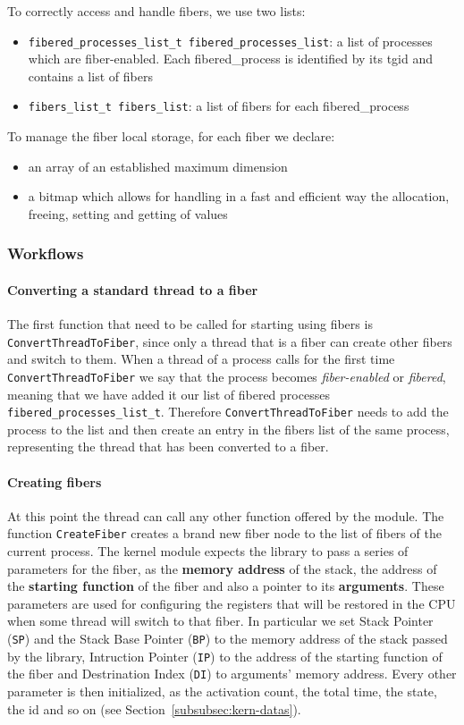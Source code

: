 \documentclass[a4paper,10pt]{article}
\begin{document}
To correctly access and handle fibers, we use two lists:
\begin{itemize}
	\item \lstinline{fibered_processes_list_t fibered_processes_list}: a list of processes which are fiber-enabled. Each fibered\_process is identified by its tgid and contains a list of fibers
	\item \lstinline{fibers_list_t fibers_list}: a list of fibers for each fibered\_process
\end{itemize}

To manage the fiber local storage, for each fiber we declare:
\begin{itemize}
	\item an array of an established maximum dimension
	\item a bitmap which allows for handling in a fast and efficient way the allocation, freeing, setting and getting of values
\end{itemize}

\subsubsection{Workflows}
\paragraph{Converting a standard thread to a fiber}
The first function that need to be called for starting using fibers is \lstinline{ConvertThreadToFiber}, since only a thread that is a fiber can create other fibers and switch to them. When a thread of a process calls for the first time \lstinline{ConvertThreadToFiber} we say that the process becomes \textit{fiber-enabled} or \textit{fibered}, meaning that we have added it our list of fibered processes \lstinline{fibered_processes_list_t}. Therefore \lstinline{ConvertThreadToFiber} needs to add the process to the list and then create an entry in the fibers list of the same process, representing the thread that has been converted to a fiber.

\paragraph{Creating fibers}
At this point the thread can call any other function offered by the module. The function \lstinline{CreateFiber} creates a brand new fiber node to the list of fibers of the current process. The kernel module expects the library to pass a series of parameters for the fiber, as the \textbf{memory address} of the stack, the address of the \textbf{starting function} of the fiber and also a pointer to its \textbf{arguments}. These parameters are used for configuring the registers that will be restored in the CPU when some thread will switch to that fiber. In particular we set Stack Pointer (\texttt{SP}) and the Stack Base Pointer (\texttt{BP}) to the memory address of the stack passed by the library, Intruction Pointer (\texttt{IP}) to the address of the starting function of the fiber and Destrination Index (\texttt{DI}) to arguments’ memory address. Every other parameter is then initialized, as the activation count, the total time, the state, the id and so on (see Section~\ref{subsubsec:kern-datas}).
\end{document}
